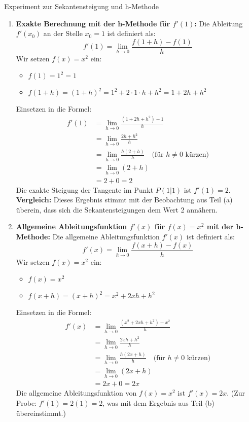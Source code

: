 \begin{loesungsumgebung}{Experiment zur Sekantensteigung und h-Methode}
\begin{enumerate}[label=(\alph*)]
    \item \textbf{Exakte Berechnung mit der h-Methode für $f'(1)$:}
    Die Ableitung $f'(x_0)$ an der Stelle $x_0=1$ ist definiert als:
    $$ f'(1) = \lim_{h \to 0} \frac{f(1+h) - f(1)}{h} $$
    Wir setzen $f(x)=x^2$ ein:
    \begin{itemize}
        \item $f(1) = 1^2 = 1$
        \item $f(1+h) = (1+h)^2 = 1^2 + 2 \cdot 1 \cdot h + h^2 = 1 + 2h + h^2$
    \end{itemize}
    Einsetzen in die Formel:
    \begin{align*}
    f'(1) &= \lim_{h \to 0} \frac{(1 + 2h + h^2) - 1}{h} \\
          &= \lim_{h \to 0} \frac{2h + h^2}{h} \\
          &= \lim_{h \to 0} \frac{h(2 + h)}{h} \quad \text{(für } h \neq 0 \text{ kürzen)} \\
          &= \lim_{h \to 0} (2 + h) \\
          &= 2 + 0 = 2
    \end{align*}
    Die exakte Steigung der Tangente im Punkt $P(1|1)$ ist $f'(1)=2$.
    \textbf{Vergleich:} Dieses Ergebnis stimmt mit der Beobachtung aus Teil (a) überein, dass sich die Sekantensteigungen dem Wert 2 annähern.

    \item \textbf{Allgemeine Ableitungsfunktion $f'(x)$ für $f(x)=x^2$ mit der h-Methode:}
    Die allgemeine Ableitungsfunktion $f'(x)$ ist definiert als:
    $$ f'(x) = \lim_{h \to 0} \frac{f(x+h) - f(x)}{h} $$
    Wir setzen $f(x)=x^2$ ein:
    \begin{itemize}
        \item $f(x) = x^2$
        \item $f(x+h) = (x+h)^2 = x^2 + 2xh + h^2$
    \end{itemize}
    Einsetzen in die Formel:
    \begin{align*}
    f'(x) &= \lim_{h \to 0} \frac{(x^2 + 2xh + h^2) - x^2}{h} \\
          &= \lim_{h \to 0} \frac{2xh + h^2}{h} \\
          &= \lim_{h \to 0} \frac{h(2x + h)}{h} \quad \text{(für } h \neq 0 \text{ kürzen)} \\
          &= \lim_{h \to 0} (2x + h) \\
          &= 2x + 0 = 2x
    \end{align*}
    Die allgemeine Ableitungsfunktion von $f(x)=x^2$ ist $f'(x)=2x$.
    (Zur Probe: $f'(1) = 2(1) = 2$, was mit dem Ergebnis aus Teil (b) übereinstimmt.)
\end{enumerate}

\end{loesungsumgebung}

